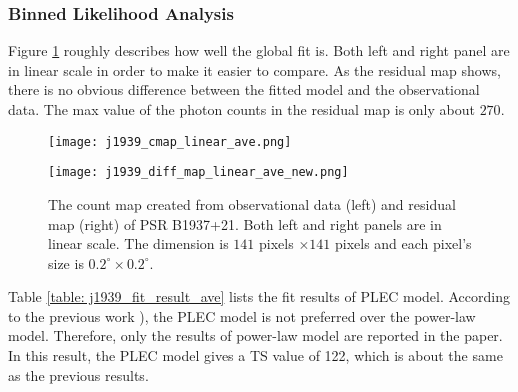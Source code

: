 \documentclass[a4paper, 12pt]{report}
\begin{document}
      \subsubsection{Binned Likelihood Analysis}
        Figure \ref{fig: j1939_count_map_diff_ave} roughly describes how well the global fit 
        is. Both left and right panel are in linear scale in order to make it easier to 
        compare. As the residual map shows, there is no obvious difference between the fitted 
        model and the observational data. The max value of the photon counts in the residual map 
        is only about $270$. 
        \begin{figure}[!htp]
          \begin{center}
          \begin{minipage}{0.45\textwidth}
            \begin{center} 
              \texttt{[image: j1939\_cmap\_linear\_ave.png]}
            \end{center}
          \end{minipage}
          \begin{minipage}{0.45\textwidth}
            \begin{center}
              \texttt{[image: j1939\_diff\_map\_linear\_ave\_new.png]}
            \end{center}
          \end{minipage}
          \end{center}
            \caption[The count map created from observational data (left) and residual map 
              (right) of PSR B1937+21.]
              {The count map created from observational data (left) and residual map (right)
              of PSR B1937+21. Both left and right panels are in linear scale. 
              The dimension is $141$ pixels $\times 141$ pixels and each pixel's 
              size is $0.2^{\circ}\times0.2^{\circ}$.}
            \label{fig: j1939_count_map_diff_ave}
        \end{figure}

        Table \ref{table: j1939_fit_result_ave} lists the fit results of PLEC model. 
        According to the previous work \citep{0004-637X-787-2-167}), 
        the PLEC model is not preferred over the power-law model. Therefore, only 
        the results of power-law model are reported in the paper. In this result, the 
        PLEC model gives a TS value of 122, which is about the same as the previous 
        results. 
\end{document}
